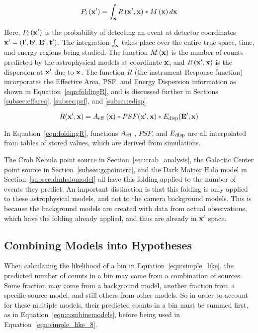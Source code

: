   \begin{equation}\label{eqn:folding}
    P_i \left( \mathbf{x'} \right ) = \int_{\mathbf{x }} R \left ( \mathbf{x'}, \mathbf{x } \right ) * M \left ( \mathbf{x } \right ) d\mathbf{x }
  \end{equation}
  
  Here, $P_i \left( \mathbf{x'} \right )$ is the probability of detecting an event at detector coordinates $\mathbf{x'} = \left ( \mathbf{l'}, \mathbf{b'}, \mathbf{E'}, \mathbf{t'} \right )$.
  The integration $\int_{\mathbf{x }}$ takes place over the entire true space, time, and energy regions being studied.
  The function $M\left ( \mathbf{x } \right )$ is the number of counts predicted by the astrophysical models at coordinate $\mathbf{x }$, and $R \left ( \mathbf{x'}, \mathbf{x } \right )$ is the dispersion at $\mathbf{x'}$ due to $\mathbf{x }$.
  The function $R$ (the instrument Response function) incorporates the Effective Area, PSF, and Energy Dispersion information as shown in Equation~\ref{eqn:foldingR}, and is discussed further in Sections \ref{subsec:effarea}, \ref{subsec:psf}, and \ref{subsec:edisp}.
  
  \begin{equation}\label{eqn:foldingR}
    R(\mathbf{x'},\mathbf{x }) = A_\textrm{eff }(\mathbf{x }) * PSF(\mathbf{x'},\mathbf{x }) * E_\textrm{disp}(\mathbf{E'},\mathbf{x })
  \end{equation}
  
  In Equation~\ref{eqn:foldingR}, functions $A_\textrm{eff }$, $PSF$, and $E_\textrm{disp}$ are all interpolated from tables of stored values, which are derived from simulations.

  The Crab Nebula point source in Section~\ref{sec:crab_analysis}, the Galactic Center point source in Section~\ref{subsec:gcpointsrc}, and the Dark Matter Halo model in Section~\ref{subsec:dmhalomodel} all have this folding applied to the number of events they predict.
  An important distinction is that this folding is only applied to these astrophysical models, and not to the camera background models.
  This is because the background models are created with data from actual observations, which have the folding already applied, and thus are already in $\mathbf{x'}$ space.
  
  \subsection{Combining Models into Hypotheses}\label{subsec:hypotheses}
  
  When calculating the likelihood of a bin in Equation~\ref{eqn:simple_like}, the predicted number of counts in a bin may come from a combination of sources.
  Some fraction may come from a background model, another fraction from a specific source model, and still others from other models.
  So in order to account for these multiple models, their predicted counts in a bin must be summed first, as in Equation~\ref{eqn:combinemodels}, before being used in Equation~\ref{eqn:simple_like_8}.
  
